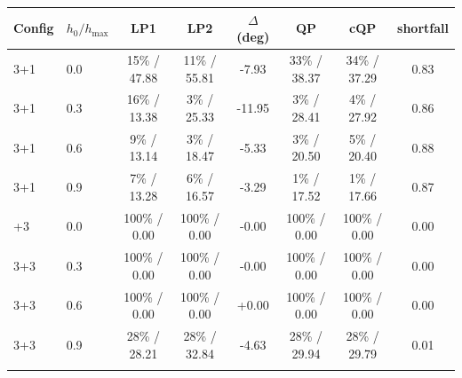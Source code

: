 \begin{tabular}{llcccccc}
\toprule
Config & $h_0/h_{\max}$ & LP1 & LP2 & $\Delta$(deg) & QP & cQP & shortfall \\
\midrule
3+1 & 0.0 & 15\% / 47.88 & 11\% / 55.81 & -7.93 & 33\% / 38.37 & 34\% / 37.29 & 0.83 \\
3+1 & 0.3 & 16\% / 13.38 & 3\% / 25.33 & -11.95 & 3\% / 28.41 & 4\% / 27.92 & 0.86 \\
3+1 & 0.6 & 9\% / 13.14 & 3\% / 18.47 & -5.33 & 3\% / 20.50 & 5\% / 20.40 & 0.88 \\
3+1 & 0.9 & 7\% / 13.28 & 6\% / 16.57 & -3.29 & 1\% / 17.52 & 1\% / 17.66 & 0.87 \\
\addlinespace
3+3 & 0.0 & 100\% / 0.00 & 100\% / 0.00 & -0.00 & 100\% / 0.00 & 100\% / 0.00 & 0.00 \\
3+3 & 0.3 & 100\% / 0.00 & 100\% / 0.00 & -0.00 & 100\% / 0.00 & 100\% / 0.00 & 0.00 \\
3+3 & 0.6 & 100\% / 0.00 & 100\% / 0.00 & +0.00 & 100\% / 0.00 & 100\% / 0.00 & 0.00 \\
3+3 & 0.9 & 28\% / 28.21 & 28\% / 32.84 & -4.63 & 28\% / 29.94 & 28\% / 29.79 & 0.01 \\
\addlinespace
\bottomrule
\end{tabular}
